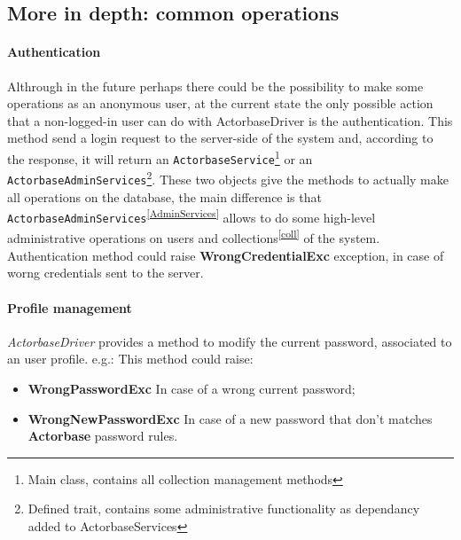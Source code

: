 \documentclass{scalatekids-article}
\begin{document}
\subsection{More in depth: common operations}

\paragraph{Authentication}

Althrough in the future perhaps there could be the possibility to make some
operations as an anonymous user, at the current state the only possible action
that a non-logged-in user can do with ActorbaseDriver is the authentication.
This method send a login request to the server-side of the system and, according
to the response, it will return an \verb=ActorbaseService=\footnote{Main class,
  contains all collection management methods\label{ActorbaseServices}} or an
\verb=ActorbaseAdminServices=\footnote{Defined trait, contains some
  administrative functionality as dependancy added to
  ActorbaseServices\label{AdminService}}. These two objects give the methods to
actually make all operations on the database, the main difference is that
\verb=ActorbaseAdminServices=\textsuperscript{\ref{AdminServices}} allows to do
some high-level administrative operations on users and
collections\textsuperscript{\ref{coll}} of the system. Authentication method
could raise \textbf{WrongCredentialExc} exception, in case of worng credentials
sent to the server.

\paragraph{Profile management}

\textit{ActorbaseDriver} provides a method to modify the current password,
associated to an user profile.
e.g.:
This method could raise:
\begin{itemize}
\item \textbf{WrongPasswordExc} In case of a wrong current password;
\item \textbf{WrongNewPasswordExc} In case of a new password that don't matches \textbf{Actorbase} password rules.
\end{itemize}
\end{document}
